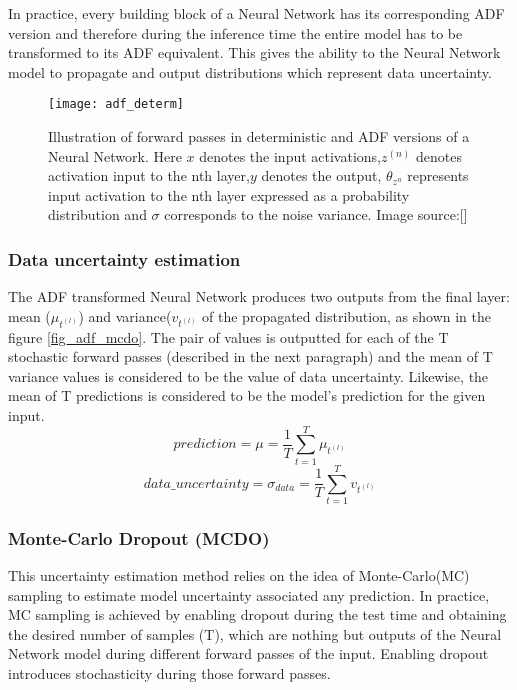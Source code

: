 	In practice, every building block of a Neural Network has its corresponding ADF version and therefore during the inference time the entire model has to be transformed to its ADF equivalent. This gives the ability to the Neural Network model to propagate and output distributions which represent data uncertainty.
	\begin{figure}[h]
		\centering
		\texttt{[image: adf\_determ]}
		\caption{Illustration of forward passes in deterministic and ADF versions of a Neural Network. Here $x$ denotes the input activations,$z^(n)$ denotes activation input to the nth layer,$y$ denotes the output, $\theta_{z^n}$ represents input activation to the nth layer expressed as a probability distribution and $\sigma$ corresponds to the noise variance. Image source:[\cite{loquercio2020a}] }
	\end{figure}
	
	\subsubsection{Data uncertainty estimation}
	The ADF transformed Neural Network produces two outputs from the final layer: mean ($\mu_{t^{(l)}}$) and variance($v_{t^{(l)}}$ of the propagated distribution, as shown in the figure \ref{fig_adf_mcdo}. The pair of values is outputted for each of the T stochastic forward passes (described in the next paragraph) and the mean of T variance values is considered to be the value of data uncertainty. Likewise, the mean of T predictions is considered to be the model's prediction for the given input.
	\begin{equation}
		prediction = \mu = \frac{1}{T}\sum_{t=1}^{T}\mu_{t^{(l)}}
	\end{equation}	 
	\begin{equation}
		data\_uncertainty = \sigma_{data}=\frac{1}{T}\sum_{t=1}^{T}v_{t^{(l)}}
	\end{equation}
	
	\subsubsection{Monte-Carlo Dropout (MCDO)}
	
	This uncertainty estimation method relies on the idea of Monte-Carlo(MC) sampling to estimate model uncertainty associated any prediction. In practice, MC sampling is achieved by enabling dropout during the test time and obtaining the desired number of samples (T), which are nothing but outputs of the Neural Network model during different forward passes of the input. Enabling dropout introduces stochasticity during those forward passes.
	
